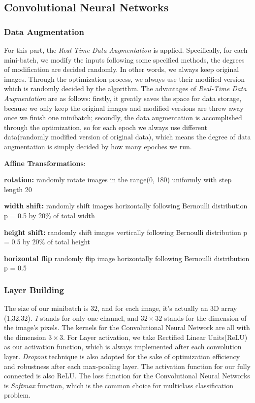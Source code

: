 \documentclass[paper=a4, fontsize=11pt]{scrartcl}
\begin{document}
\subsection*{Convolutional Neural Networks}
\subsubsection*{Data Augmentation}
For this part, the \textit{Real-Time Data Augmentation} is applied. Specifically, for each mini-batch, we modify the inputs following some specified methods, the degrees of modification are decided randomly. In other words, we always keep original images. Through the optimization process, we always use their modified version which is randomly decided by the algorithm. The advantages of \textit{Real-Time Data Augmentation} are as follows: firstly, it greatly saves the space for data storage, because we only keep the original images and modified versions are threw away once we finish one minibatch; secondly, the data augmentation is accomplished through the optimization, so for each epoch we always use different data(randomly modified version of original data), which means the degree of data augmentation is simply decided by how many epoches we run.

\textbf{Affine Transformations}:

\textbf{rotation:} randomly rotate images in the range(0\degree, 180\degree) uniformly with step length 20\degree

\textbf{width shift:} randomly shift images horizontally following Bernoulli distribution p = 0.5 by 20\% of total width

\textbf{height shift:} randomly shift images vertically following Bernoulli distribution p = 0.5 by 20\% of total height

\textbf{horizontal flip} randomly flip image horizontally following Bernoulli distribution p = 0.5

\subsubsection*{Layer Building}
The size of our minibatch is $32$, and for each image, it's actually an 3D array (1,32,32). \textit{1} stands for only one channel, and $32 \times 32$ stands for the dimension of the image's pixels.  The kernels for the Convolutional Neural Network are all with the dimension $3 \times 3$. For Layer activation, we take Rectified Linear Units(ReLU) as our activation function, which is always implemented after each convolution layer. \textit{Dropout} technique is also adopted for the sake of optimization efficiency and robustness after each max-pooling layer. The activation function for our fully connected is also ReLU. The loss function for the Convolutional Neural Networks is \textit{Softmax} function, which is the common choice for multiclass classification problem.
\end{document}
